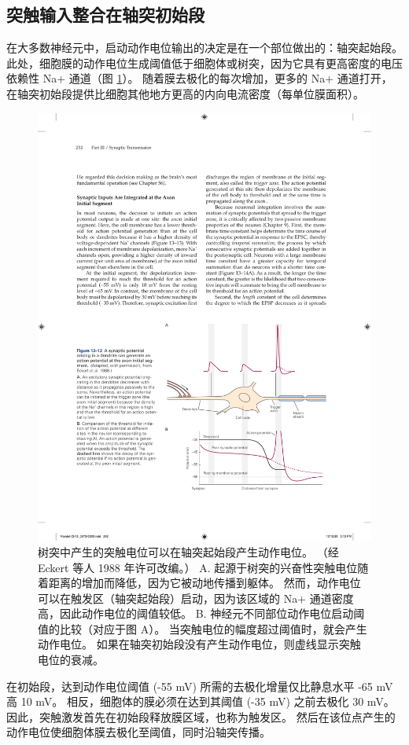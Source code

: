 \subsection{突触输入整合在轴突初始段}
在大多数神经元中，启动动作电位输出的决定是在一个部位做出的：轴突起始段。 
此处，细胞膜的动作电位生成阈值低于细胞体或树突，因为它具有更高密度的电压依赖性 Na+ 通道（图 \ref{fig:13_13}）。 
随着膜去极化的每次增加，更多的 Na+ 通道打开，在轴突初始段提供比细胞其他地方更高的内向电流密度（每单位膜面积）。

\begin{figure}[htbp]
	\centering
	\includegraphics[width=0.7\linewidth]{chap13/fig_13_13}
	\caption{树突中产生的突触电位可以在轴突起始段产生动作电位。 （经 Eckert 等人 1988 年许可改编。） A. 起源于树突的兴奋性突触电位随着距离的增加而降低，因为它被动地传播到躯体。 然而，动作电位可以在触发区（轴突起始段）启动，因为该区域的 Na+ 通道密度高，因此动作电位的阈值较低。 B. 神经元不同部位动作电位启动阈值的比较（对应于图 A）。 当突触电位的幅度超过阈值时，就会产生动作电位。 如果在轴突初始段没有产生动作电位，则虚线显示突触电位的衰减。}
	\label{fig:13_13}
\end{figure}


在初始段，达到动作电位阈值 (-55 mV) 所需的去极化增量仅比静息水平 -65 mV 高 10 mV。 
相反，细胞体的膜必须在达到其阈值 (-35 mV) 之前去极化 30 mV。 
因此，突触激发首先在初始段释放膜区域，也称为触发区。 
然后在该位点产生的动作电位使细胞体膜去极化至阈值，同时沿轴突传播。


